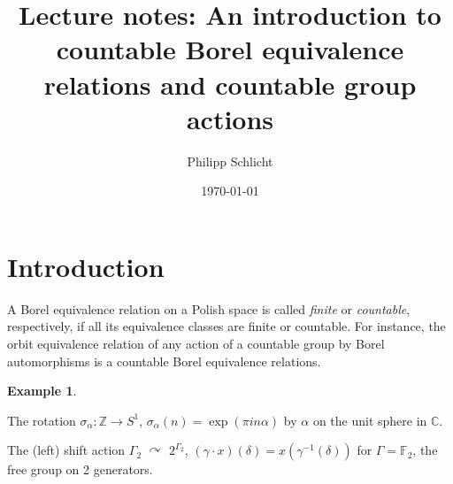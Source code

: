 \documentclass[10pt]{amsart}
\newcommand{\TT}{\mathbb{T}}
\newcommand{\FF}{\mathbb{F}}
\newcommand{\ZZ}{\mathbb{Z}}
\newcommand{\QQ}{\mathbb{Q}}
\newcommand{\RR}{\mathbb{R}}
\newcommand{\CCC}{\mathbb{C}}
\theoremstyle{definition}
\newtheorem*{example*}{Example}
\theoremstyle{remark}
\newenvironment{enumerate-(a)}{\begin{enumerate}[label={\upshape (\alph*)}, leftmargin=2pc]}{\end{enumerate}}
\begin{document}




\author{Philipp Schlicht}
\address{Philipp Schlicht, School of Mathematics, University of Bristol, Fry Building, Woodland Road, Bristol, BS8 1UG, UK}
\urladdr{}

\date{\today}


\title[Lecture notes: Countable Borel equivalence relations]{Lecture notes: An introduction to countable Borel equivalence relations and countable group actions}


\maketitle


\setcounter{tocdepth}{2}
\tableofcontents 






\section{Introduction} 

A Borel equivalence relation on a Polish space is called \emph{finite} or \emph{countable}, respectively, if all its equivalence classes are finite or countable. 
For instance, the orbit equivalence relation of any action of a countable group by Borel automorphisms is a countable Borel equivalence relations. 


\begin{example*} 
\begin{enumerate-(a)} 
\item 
The rotation $\sigma_\alpha\colon \ZZ\rightarrow S^1$, $\sigma_\alpha(n)=\exp(\pi i n \alpha)$ by $\alpha$ on the unit sphere in $\CCC$. 
\item 
The (left) shift action $\Gamma_2$ $\curvearrowright$ $2^{\Gamma_2}$, $(\gamma\cdot x)(\delta)=x(\gamma^{-1}(\delta))$ for $\Gamma=\FF_2$, the free group on 2 generators. 
\end{enumerate-(a)} 
\end{example*} 
\end{document}
